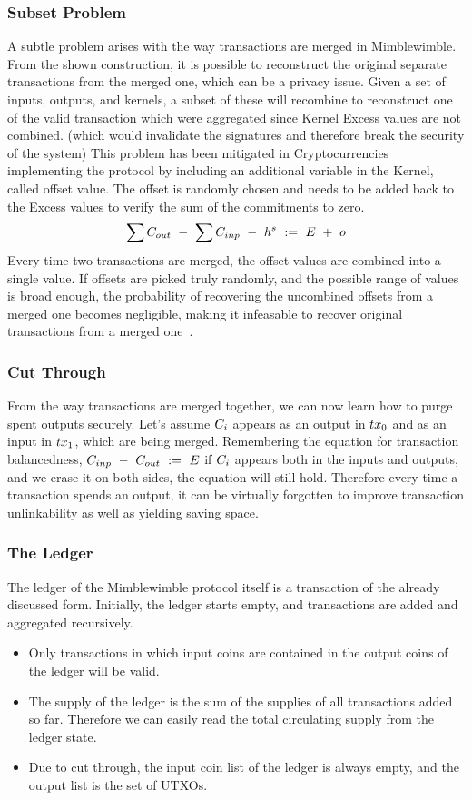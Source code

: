 \subsubsection{Subset Problem}
A subtle problem arises with the way transactions are merged in Mimblewimble. From the shown construction, it is possible to reconstruct the original separate transactions from the merged one,
which can be a privacy issue.  Given a set of inputs, outputs, and kernels, a subset of these will recombine to reconstruct one of the valid transaction which were aggregated since Kernel Excess values are not combined.
(which would invalidate the signatures and therefore break the security of the system) This problem has been mitigated in Cryptocurrencies implementing the protocol by including an
additional variable in the Kernel, called offset value. The offset is randomly chosen and needs to be added back to the Excess values to verify the sum of the commitments to zero.
\[ \sum{C_{out}} ~-~ \sum C_{inp} ~-~ h^{s} ~:=~ E ~+~ o\]
Every time two transactions are merged, the offset values are combined into a single value. If offsets are picked truly randomly, and the possible range of values is broad enough, the probability of recovering the
uncombined offsets from a merged one becomes negligible, making it infeasable to recover original transactions from a merged one~\cite{poelstra2016mimblewimble}.

\subsubsection{Cut Through}
From the way transactions are merged together, we can now learn how to purge spent outputs securely. Let's assume $C_i$ appears as an output in $tx_0$ and as an input in $tx_1$,
which are being merged. Remembering the equation for transaction balancedness, $C_{inp} ~-~ C_{out} ~:=~ E$ if $C_i$ appears both in the inputs and outputs, and we erase it on both sides, the equation will still hold.
Therefore every time a transaction spends an output, it can be virtually forgotten to improve transaction unlinkability as well as yielding saving space.

\subsubsection{The Ledger}
The ledger of the Mimblewimble protocol itself is a transaction of the already discussed form. Initially, the ledger starts empty, and transactions are added and aggregated recursively.
\begin{itemize}
    \item Only transactions in which input coins are contained in the output coins of the ledger will be valid.
    \item The supply of the ledger is the sum of the supplies of all transactions added so far. Therefore we can easily read the total circulating supply from the ledger state.
    \item Due to cut through, the input coin list of the ledger is always empty, and the output list is the set of UTXOs.
\end{itemize}

